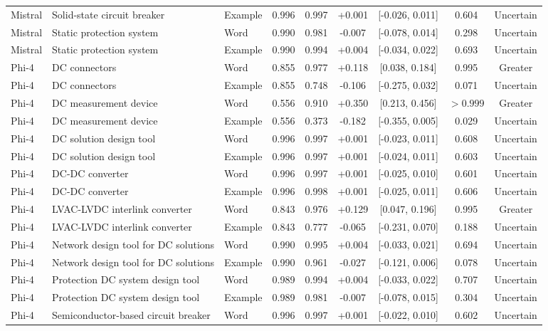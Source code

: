 \begin{landscape}
\begin{longtable}{lllcccccc}
Mistral & Solid-state circuit breaker & Example & 0.996 & 0.997 & +0.001 & [-0.026, 0.011] & 0.604 & Uncertain \\
Mistral & Static protection system & Word & 0.990 & 0.981 & -0.007 & [-0.078, 0.014] & 0.298 & Uncertain \\
Mistral & Static protection system & Example & 0.990 & 0.994 & +0.004 & [-0.034, 0.022] & 0.693 & Uncertain \\
Phi-4 & DC connectors & Word & 0.855 & 0.977 & +0.118 & [0.038, 0.184] & 0.995 & Greater \\
Phi-4 & DC connectors & Example & 0.855 & 0.748 & -0.106 & [-0.275, 0.032] & 0.071 & Uncertain \\
Phi-4 & DC measurement device & Word & 0.556 & 0.910 & +0.350 & [0.213, 0.456] & $>0.999$ & Greater \\
Phi-4 & DC measurement device & Example & 0.556 & 0.373 & -0.182 & [-0.355, 0.005] & 0.029 & Uncertain \\
Phi-4 & DC solution design tool & Word & 0.996 & 0.997 & +0.001 & [-0.023, 0.011] & 0.608 & Uncertain \\
Phi-4 & DC solution design tool & Example & 0.996 & 0.997 & +0.001 & [-0.024, 0.011] & 0.603 & Uncertain \\
Phi-4 & DC-DC converter & Word & 0.996 & 0.997 & +0.001 & [-0.025, 0.010] & 0.601 & Uncertain \\
Phi-4 & DC-DC converter & Example & 0.996 & 0.998 & +0.001 & [-0.025, 0.011] & 0.606 & Uncertain \\
Phi-4 & LVAC-LVDC interlink converter & Word & 0.843 & 0.976 & +0.129 & [0.047, 0.196] & 0.995 & Greater \\
Phi-4 & LVAC-LVDC interlink converter & Example & 0.843 & 0.777 & -0.065 & [-0.231, 0.070] & 0.188 & Uncertain \\
Phi-4 & Network design tool for DC solutions & Word & 0.990 & 0.995 & +0.004 & [-0.033, 0.021] & 0.694 & Uncertain \\
Phi-4 & Network design tool for DC solutions & Example & 0.990 & 0.961 & -0.027 & [-0.121, 0.006] & 0.078 & Uncertain \\
Phi-4 & Protection DC system design tool & Word & 0.989 & 0.994 & +0.004 & [-0.033, 0.022] & 0.707 & Uncertain \\
Phi-4 & Protection DC system design tool & Example & 0.989 & 0.981 & -0.007 & [-0.078, 0.015] & 0.304 & Uncertain \\
Phi-4 & Semiconductor-based circuit breaker & Word & 0.996 & 0.997 & +0.001 & [-0.022, 0.010] & 0.602 & Uncertain \\

\end{longtable}
\end{landscape}
